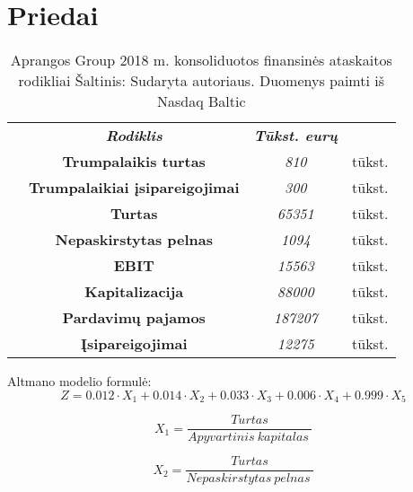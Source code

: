 \documentclass[titlepage, 11pt]{article}
\begin{document}
\section{Priedai}
\begin{table}[H]
\captionsetup{justification=centering}
\centering
\begin{tabular}{l|c|c|l|}
\cline{2-4}
 & \textit{\textbf{Rodiklis}}             & \textit{\textbf{Tūkst. eurų}} & \textbf{} \\ \cline{2-4} 
 & \textbf{Trumpalaikis turtas}           & \textit{810}                  & tūkst.    \\ \cline{2-4} 
 & \textbf{Trumpalaikiai įsipareigojimai} & \textit{300}                  & tūkst.    \\ \cline{2-4} 
 & \textbf{Turtas}                        & \textit{65351}                & tūkst.    \\ \cline{2-4} 
 & \textbf{Nepaskirstytas pelnas}          & \textit{1094}                 & tūkst.    \\ \cline{2-4} 
 & \textbf{EBIT}                          & \textit{15563}                & tūkst.    \\ \cline{2-4} 
 & \textbf{Kapitalizacija}                & \textit{88000}                & tūkst.    \\ \cline{2-4} 
 & \textbf{Pardavimų pajamos}             & \textit{187207}               & tūkst.    \\ \cline{2-4} 
 & \textbf{Įsipareigojimai}               & \textit{12275}                & tūkst.    \\ \cline{2-4} 
\end{tabular}
\caption{Aprangos Group 2018 m. konsoliduotos finansinės ataskaitos rodikliai \newline
Šaltinis: Sudaryta autoriaus. Duomenys paimti iš Nasdaq Baltic}
\end{table}

Altmano modelio formulė:
\begin{equation}
Z = 0.012 · X_1 + 0.014 · X_2 + 0.033 · X_3 + 0.006 · X_4 + 0.999 · X_5
\end{equation}

\begin{equation}
X_1 = \frac{Turtas}{Apyvartinis \ kapitalas \ }
\end{equation}

\begin{equation}
X_2 = \frac{Turtas}{Nepaskirstytas \ pelnas \ }
\end{equation}
\end{document}
